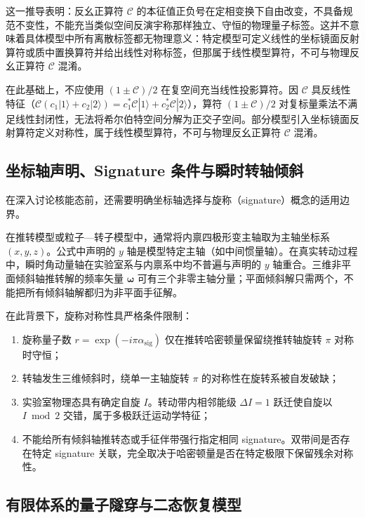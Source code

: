 这一推导表明：反幺正算符 $\mathcal{C}$ 的本征值正负号在定相变换下自由改变，不具备规范不变性，不能充当类似空间反演宇称那样独立、守恒的物理量子标签。这并不意味着具体模型中所有离散标签都无物理意义：特定模型可定义线性的坐标镜面反射算符或质中置换算符并给出线性对称标签，但那属于线性模型算符，不可与物理反幺正算符 $\mathcal{C}$ 混淆。

在此基础上，不应使用 $(1 \pm \mathcal{C})/2$ 在复空间充当线性投影算符。因 $\mathcal{C}$ 具反线性特征（$\mathcal{C}(c_1 |1\rangle + c_2 |2\rangle) = c_1^* \mathcal{C}|1\rangle + c_2^* \mathcal{C}|2\rangle$），算符 $(1 \pm \mathcal{C})/2$ 对复标量乘法不满足线性封闭性，无法将希尔伯特空间分解为正交子空间。部分模型引入坐标镜面反射算符定义对称性，属于线性模型算符，不可与物理反幺正算符 $\mathcal{C}$ 混淆。

\subsection{坐标轴声明、Signature 条件与瞬时转轴倾斜}\label{sec:3-5-4}

在深入讨论核能态前，还需要明确坐标轴选择与旋称（signature）概念的适用边界。

在推转模型或粒子—转子模型中，通常将内禀四极形变主轴取为主轴坐标系 $(x, y, z)$。公式中声明的 $y$ 轴是模型特定主轴（如中间惯量轴）。在真实转动过程中，瞬时角动量轴在实验室系与内禀系中均不普遍与声明的 $y$ 轴重合。三维非平面倾斜轴推转解的频率矢量 $\boldsymbol{\omega}$ 可有三个非零主轴分量；平面倾斜解只需两个，不能把所有倾斜轴解都归为非平面手征解。

在此背景下，旋称对称性具严格条件限制：
\begin{enumerate}
\item 旋称量子数 $r = \exp(-i\pi\alpha_{\text{sig}})$ 仅在推转哈密顿量保留绕推转轴旋转 $\pi$ 对称时守恒；
\item 转轴发生三维倾斜时，绕单一主轴旋转 $\pi$ 的对称性在旋转系被自发破缺；
\item 实验室物理态具有确定自旋 $I$。转动带内相邻能级 $\Delta I = 1$ 跃迁使自旋以 $I \bmod 2$ 交错，属于多极跃迁运动学特征；
\item 不能给所有倾斜轴推转态或手征伴带强行指定相同 signature。双带间是否存在特定 signature 关联，完全取决于哈密顿量是否在特定极限下保留残余对称性。
\end{enumerate}

\subsection{有限体系的量子隧穿与二态恢复模型}\label{sec:3-5-5}

